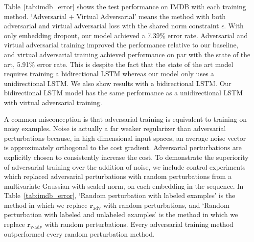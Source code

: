 \documentclass{article}
\newcommand{\vr}{\bm{r}}
\begin{document}
Table~\ref{tab:imdb_error} shows the test performance on IMDB with each training
method.
`Adversarial + Virtual Adversarial' means the method with both adversarial and
virtual adversarial loss with the shared norm constraint $\epsilon$.
With only embedding dropout, our model achieved a 7.39\% error rate.
Adversarial and virtual adversarial training improved the performance
relative to our baseline, and virtual adversarial training achieved performance on par with
the state of
the art, 5.91\% error rate. This is despite the fact that the state of the art
model requires training a bidirectional LSTM whereas our model only uses a unidirectional LSTM.
We also show results with a bidirectional LSTM. Our bidirectional LSTM model
has the same performance as a unidirectional LSTM with virtual adversarial training.
 
A common misconception is that adversarial training is equivalent to training on
noisy examples.
Noise is actually a far weaker regularizer than adversarial perturbations because,
in high dimensional input spaces, an average noise vector is approximately orthogonal
to the cost gradient.
Adversarial perturbations are explicitly chosen to consistently increase the cost.
To demonstrate the superiority of adversarial training over the addition of noise,
we include control experiments 
which replaced adversarial perturbations with
random perturbations from a multivariate Gaussian with scaled norm, on each embedding in the sequence.
In Table~\ref{tab:imdb_error}, `Random perturbation with labeled examples' 
is the method in which we replace $\vr_{\mathrm{adv}}$ with random perturbations,
and `Random perturbation with labeled and unlabeled examples' is the method
in which we replace $\vr_{\mathrm{v\text{-}adv}}$ with random perturbations.
Every adversarial training method outperformed every random perturbation method.
\end{document}
